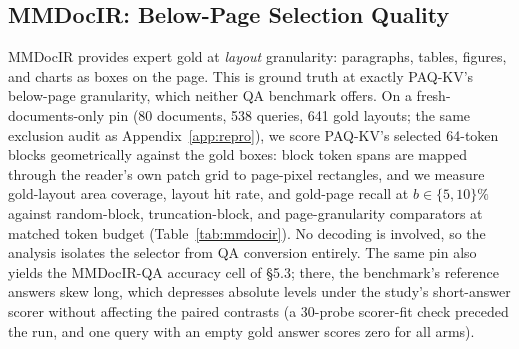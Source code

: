 \documentclass[letterpaper]{article} %
\newcommand{\paqc}{\textsc{PAQ-KV}}
\begin{document}
\subsection{MMDocIR: Below-Page Selection Quality}\label{app:mmdocir}

MMDocIR \citep{dong2025mmdocir} provides expert gold at \emph{layout}
granularity: paragraphs, tables, figures, and charts as boxes on the page.
This is ground truth at exactly \paqc{}'s below-page granularity, which
neither QA benchmark offers. On a fresh-documents-only pin (80 documents, 538
queries, 641 gold layouts; the same exclusion audit as
Appendix~\ref{app:repro}), we score \paqc{}'s selected 64-token blocks
geometrically against the gold boxes: block token spans are mapped through
the reader's own patch grid to page-pixel rectangles, and we measure
gold-layout area coverage, layout hit rate, and gold-page recall at
$b\in\{5,10\}\%$ against random-block, truncation-block, and page-granularity
comparators at matched token budget (Table~\ref{tab:mmdocir}). No decoding is
involved, so the analysis isolates the selector from QA conversion entirely.
The same pin also yields the MMDocIR-QA accuracy cell of
\S5.3; there, the benchmark's reference answers skew
long, which depresses absolute levels under the study's short-answer scorer
without affecting the paired contrasts (a 30-probe scorer-fit check preceded
the run, and one query with an empty gold answer scores zero for all arms).

\begin{table}[t]
\centering\scriptsize
\setlength{\tabcolsep}{2pt}

\caption{Selection quality against MMDocIR's sub-page gold layouts on the
80-document fresh pin (538 queries). ``Coverage'' is the fraction of
gold-layout area covered by selected blocks on gold pages; ``hit'' the
fraction of gold layouts touched at all; ``gold-page recall'' the fraction of
gold pages receiving any block. Development-grade.}
\label{tab:mmdocir}
\end{table}
\end{document}
